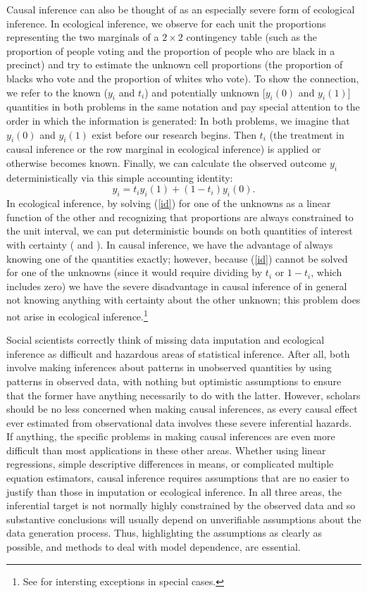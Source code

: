 \documentclass[11pt,titlepage]{article}
\begin{document}
Causal inference can also be thought of as an especially severe form
of ecological inference.  In ecological inference, we observe for each
unit the proportions representing the two marginals of a $2\times 2$
contingency table (such as the proportion of people voting and the
proportion of people who are black in a precinct) and try to estimate
the unknown cell proportions (the proportion of blacks who vote and
the proportion of whites who vote).  To show the connection, we refer
to the known ($y_i$ and $t_i$) and potentially unknown [$y_i(0)$ and
$y_i(1)$] quantities in both problems in the same notation and pay
special attention to the order in which the information is generated:
In both problems, we imagine that $y_i(0)$ and $y_i(1)$ exist
before our research begins.  Then $t_i$ (the treatment in
causal inference or the row marginal in ecological inference) is
applied or otherwise becomes known.  Finally, we can calculate the
observed outcome $y_i$ deterministically via this simple accounting
identity:
\begin{equation}
  \label{id}
  y_i = t_iy_i(1) + (1-t_i)y_i(0).
\end{equation}
In ecological inference, by solving (\ref{id}) for one of the unknowns
as a linear function of the other and recognizing that proportions are
always constrained to the unit interval, we can put deterministic
bounds on both quantities of interest with certainty
(\citealp{DunDav53} and \citealp[][ch.5]{King97}).  In causal
inference, we have the advantage of always knowing one of the
quantities exactly; however, because (\ref{id}) cannot be solved for
one of the unknowns (since it would require dividing by $t_i$ or
$1-t_i$, which includes zero) we have the severe disadvantage in
causal inference of in general not knowing anything with certainty
about the other unknown; this problem does not arise in ecological
inference.\footnote{See \citet{Manski95} for intersting exceptions in
  special cases.}

Social scientists correctly think of missing data imputation and
ecological inference as difficult and hazardous areas of statistical
inference.  After all, both involve making inferences about patterns
in unobserved quantities by using patterns in observed data, with
nothing but optimistic assumptions to ensure that the former have
anything necessarily to do with the latter.  However, scholars should
be no less concerned when making causal inferences, as every causal
effect ever estimated from observational data involves these severe
inferential hazards.  If anything, the specific problems in making
causal inferences are even more difficult than most applications in
these other areas.  Whether using linear regressions, simple
descriptive differences in means, or complicated multiple equation
estimators, causal inference requires assumptions that are no easier
to justify than those in imputation or ecological inference.  In all
three areas, the inferential target is not normally highly constrained
by the observed data and so substantive conclusions will usually
depend on unverifiable assumptions about the data generation process.
Thus, highlighting the assumptions as clearly as possible, and methods
to deal with model dependence, are essential.
\end{document}
